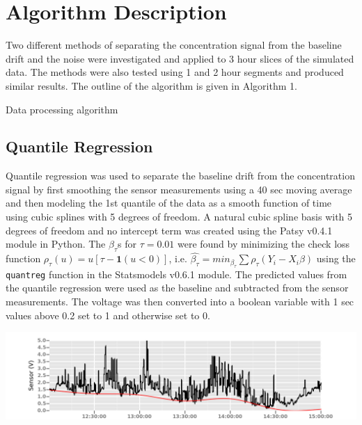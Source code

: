\documentclass[fontsize=11pt]{scrartcl} %
\begin{document}
\section{Algorithm Description}
Two different methods of separating the concentration signal from the baseline drift and the noise were investigated and applied to 3 hour slices of the simulated data. The methods were also tested using 1 and 2 hour segments and produced similar results. The outline of the algorithm is given in Algorithm 1. 

\begin{algorithm}[H]
	\caption{Data processing algorithm}
\end{algorithm}
 
\subsection{Quantile Regression} 
Quantile regression was used to separate the baseline drift from the concentration signal by first smoothing the sensor measurements using a 40 sec moving average and then modeling the 1st quantile of the data as a smooth function of time using cubic splines with 5 degrees of freedom. A natural cubic spline basis with 5 degrees of freedom and no intercept term was created using the Patsy v0.4.1 module in Python. The $\beta_\tau$s for $\tau = 0.01$ were found by minimizing the check loss function $\rho_\tau(u) = u[\tau-\mathbf{1}(u < 0)]$, i.e. $\hat{\beta_\tau} = min_{\beta_\tau}\sum\rho_\tau(Y_i -  X_i\beta)$ using the \texttt{quantreg} function in the Statsmodels v0.6.1 module. The predicted values from the quantile regression were used as the baseline and subtracted from the sensor measurements. The voltage was then converted into a boolean variable with 1 sec values above 0.2 set to 1 and otherwise set to 0. 


\begin{center}			
	\includegraphics[width=\linewidth]{Spline_fit}
\end{center}
\end{document}
